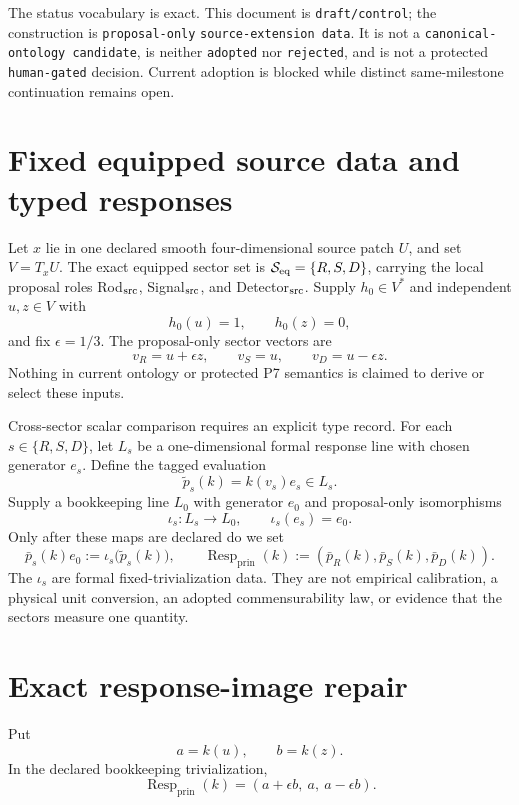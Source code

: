 \documentclass[11pt]{article}
\newcommand{\Resp}{\operatorname{Resp}_{\mathrm{prin}}}
\begin{document}
The status vocabulary is exact.  This document is \texttt{draft/control}; the
construction is \texttt{proposal-only} \texttt{source-extension data}.
It is not a \texttt{canonical-ontology candidate}, is neither
\texttt{adopted} nor \texttt{rejected}, and is not a protected
\texttt{human-gated} decision.  Current adoption is blocked while distinct
same-milestone continuation remains open.

\section{Fixed equipped source data and typed responses}

Let $x$ lie in one declared smooth four-dimensional source patch $U$, and set
$V=T_xU$.  The exact equipped sector set is
${\cal S}_{\rm eq}=\{R,S,D\}$, carrying the local proposal roles
Rod$_{\rm src}$, Signal$_{\rm src}$, and Detector$_{\rm src}$.
Supply $h_0\in V^*$ and independent $u,z\in V$ with
\[
 h_0(u)=1,\qquad h_0(z)=0,
\]
and fix $\epsilon=1/3$.  The proposal-only sector vectors are
\[
 v_R=u+\epsilon z,\qquad v_S=u,\qquad v_D=u-\epsilon z.
\]
Nothing in current ontology or protected P7 semantics is claimed to derive or
select these inputs.

Cross-sector scalar comparison requires an explicit type record.  For each
$s\in\{R,S,D\}$, let $L_s$ be a one-dimensional formal response line with
chosen generator $e_s$.  Define the tagged evaluation
\[
 \widetilde p_s(k)=k(v_s)e_s\in L_s.
\]
Supply a bookkeeping line $L_0$ with generator $e_0$ and proposal-only
isomorphisms
\[
 \iota_s:L_s\longrightarrow L_0,\qquad \iota_s(e_s)=e_0.
\]
Only after these maps are declared do we set
\[
 \bar p_s(k)e_0:=\iota_s\bigl(\widetilde p_s(k)\bigr),
 \qquad
 \Resp(k):=(\bar p_R(k),\bar p_S(k),\bar p_D(k)).
\]
The $\iota_s$ are formal fixed-trivialization data.  They are not empirical
calibration, a physical unit conversion, an adopted commensurability law, or
evidence that the sectors measure one quantity.

\section{Exact response-image repair}

Put
\[
 a=k(u),\qquad b=k(z).
\]
In the declared bookkeeping trivialization,
\begin{equation}\label{eq:response}
 \Resp(k)=(a+\epsilon b,\ a,\ a-\epsilon b).
\end{equation}
\end{document}
